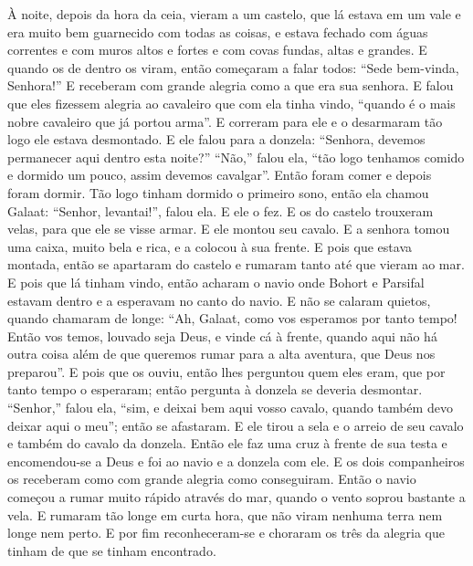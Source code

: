À noite, depois da hora da ceia, vieram a um castelo, que lá estava em um vale e
era muito bem guarnecido com todas as coisas, e estava fechado com águas
correntes e com muros altos e fortes e com covas fundas, altas e grandes. E
quando os de dentro os viram, então começaram a falar todos: “Sede bem-vinda,
Senhora!” E receberam com grande alegria como a que era sua senhora. E falou
que eles fizessem alegria ao cavaleiro que com ela tinha vindo, “quando é o
mais nobre cavaleiro que já portou arma”. E correram para ele e o desarmaram
tão logo ele estava desmontado. E ele falou para a donzela: “Senhora, devemos
permanecer aqui dentro esta noite?” “Não,” falou ela, “tão logo tenhamos
comido e dormido um pouco, assim devemos cavalgar”. Então foram comer e depois
foram dormir. Tão logo tinham dormido o primeiro sono, então ela chamou Galaat:
“Senhor, levantai!”, falou ela. E ele o fez. E os do castelo trouxeram velas,
para que ele se visse armar. E ele montou seu cavalo. E a senhora tomou uma
caixa, muito bela e rica, e a colocou à sua frente. E pois que estava montada,
então se apartaram do castelo e rumaram tanto até que vieram ao mar. E pois que
lá tinham vindo, então acharam o navio onde Bohort e Parsifal estavam dentro e
a esperavam no canto do navio. E não se calaram quietos, quando chamaram de
longe: “Ah, Galaat, como vos esperamos por tanto tempo! Então vos temos,
louvado seja Deus, e vinde cá à frente, quando aqui não há outra coisa além de
que queremos rumar para a alta aventura, que Deus nos preparou”. E pois que os
ouviu, então lhes perguntou quem eles eram, que por tanto tempo o esperaram;
então pergunta à donzela se deveria desmontar. “Senhor,” falou ela, “sim, e
deixai bem aqui vosso cavalo, quando também devo deixar aqui o meu”; então se
afastaram. E ele tirou a sela e o arreio de seu cavalo e também do cavalo da
donzela. Então ele faz uma cruz à frente de sua testa e encomendou-se a Deus e
foi ao navio e a donzela com ele. E os dois companheiros os receberam como com
grande alegria como conseguiram. Então o navio começou a rumar muito rápido
através do mar, quando o vento soprou bastante a vela. E rumaram tão longe em
curta hora, que não viram nenhuma terra nem longe nem perto. E por fim
reconheceram-se e choraram os três da alegria que tinham de que se tinham
encontrado.

